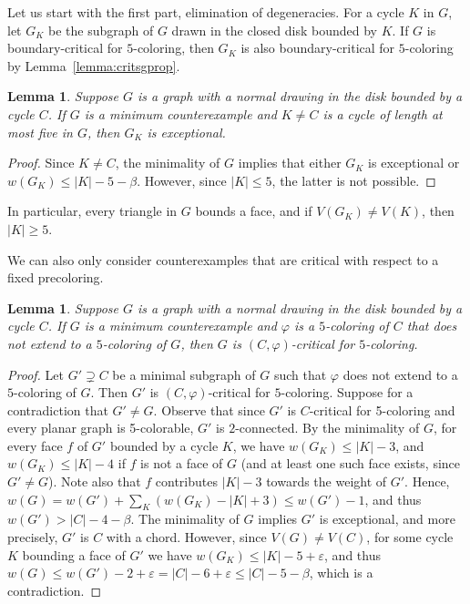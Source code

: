 \documentclass[12pt,twoside,openright,a4paper]{book}
\newtheorem{lemma}[theorem]{Lemma}
\begin{document}
Let us start with the first part, elimination of degeneracies.
For a cycle $K$ in $G$, let $G_K$ be the subgraph of $G$ drawn in the closed disk bounded by $K$.
If $G$ is boundary-critical for $5$-coloring, then $G_K$ is also boundary-critical for $5$-coloring by Lemma~\ref{lemma:critsgprop}.
\begin{lemma}\label{lemma:wt5sep}
Suppose $G$ is a graph with a normal drawing in the disk bounded by a cycle $C$.
If $G$ is a minimum counterexample and $K\neq C$ is a cycle of length at most five in $G$,
then $G_K$ is exceptional.
\end{lemma}
\begin{proof}
Since $K\neq C$, the minimality of $G$ implies that either $G_K$ is exceptional or $w(G_K)\le |K|-5-\beta$.
However, since $|K|\le 5$, the latter is not possible.
\end{proof}
In particular, every triangle in $G$ bounds a face, and if $V(G_K)\neq V(K)$, then $|K|\ge 5$.

We can also only consider counterexamples that are critical with respect to a fixed precoloring.
\begin{lemma}\label{lemma:wt5crcol}
Suppose $G$ is a graph with a normal drawing in the disk bounded by a cycle $C$.
If $G$ is a minimum counterexample and $\varphi$ is a $5$-coloring of $C$ that does not extend
to a $5$-coloring of $G$, then $G$ is $(C,\varphi)$-critical for $5$-coloring.
\end{lemma}
\begin{proof}
Let $G'\supsetneq C$ be a minimal subgraph of $G$ such that $\varphi$ does not extend to a $5$-coloring of $G$.
Then $G'$ is $(C,\varphi)$-critical for $5$-coloring.  Suppose for a contradiction that $G'\neq G$.
Observe that since $G'$ is $C$-critical for 5-coloring and every planar graph is 5-colorable, $G'$ is $2$-connected.
By the minimality of $G$, for every face $f$ of $G'$ bounded by a cycle $K$, we have $w(G_K)\le |K|-3$,
and $w(G_K)\le |K|-4$ if $f$ is not a face of $G$ (and at least one such face exists, since $G'\neq G$).
Note also that $f$ contributes $|K|-3$ towards the weight of $G'$.  Hence,
$w(G)=w(G')+\sum_K (w(G_K)-|K|+3)\le w(G')-1$, and thus $w(G')>|C|-4-\beta$.
The minimality of $G$ implies $G'$ is exceptional, and more precisely, $G'$ is $C$ with a chord.
However, since $V(G)\neq V(C)$, for some cycle $K$ bounding a face of $G'$ we have
$w(G_K)\le |K|-5+\varepsilon$, and thus $w(G)\le w(G')-2+\varepsilon=|C|-6+\varepsilon\le |C|-5-\beta$,
which is a contradiction.
\end{proof}
\end{document}
